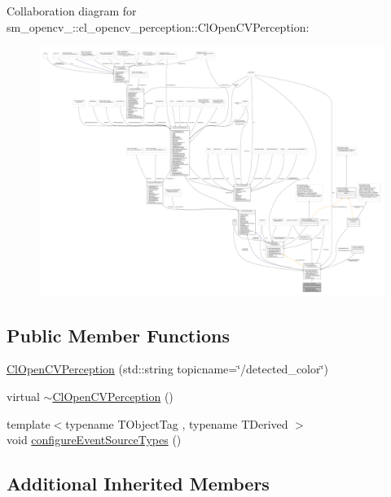 Collaboration diagram for sm\+\_\+opencv\+\_\+:\+:cl\+\_\+opencv\+\_\+perception\+:\+:Cl\+Open\+C\+V\+Perception\+:
\nopagebreak
\begin{figure}[H]
\begin{center}
\leavevmode
\includegraphics[width=350pt]{classsm__opencv__3_1_1cl__opencv__perception_1_1ClOpenCVPerception__coll__graph}
\end{center}
\end{figure}
\subsection*{Public Member Functions}
\begin{DoxyCompactItemize}
\item 
\hyperlink{classsm__opencv__3_1_1cl__opencv__perception_1_1ClOpenCVPerception_a2fb12fe010ff135d60f4e6f2a63ce54e}{Cl\+Open\+C\+V\+Perception} (std\+::string topicname=\char`\"{}/detected\+\_\+color\char`\"{})
\item 
virtual \hyperlink{classsm__opencv__3_1_1cl__opencv__perception_1_1ClOpenCVPerception_a955f4a3c2ae5e4cb2f7cd39aca1ab58c}{$\sim$\+Cl\+Open\+C\+V\+Perception} ()
\item 
{\footnotesize template$<$typename T\+Object\+Tag , typename T\+Derived $>$ }\\void \hyperlink{classsm__opencv__3_1_1cl__opencv__perception_1_1ClOpenCVPerception_accd30f3e411c1c289826c27f4f653c49}{configure\+Event\+Source\+Types} ()
\end{DoxyCompactItemize}
\subsection*{Additional Inherited Members}


